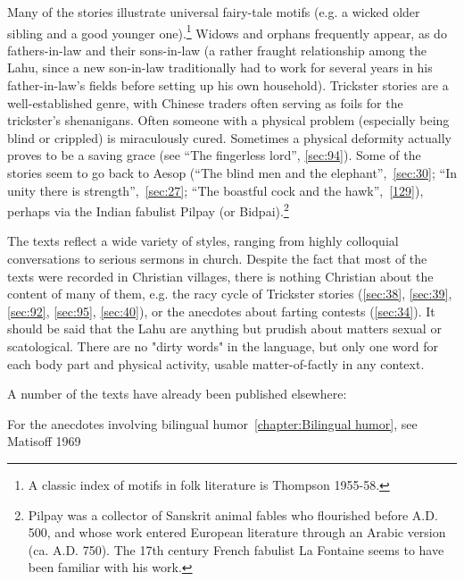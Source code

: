 Many of the stories illustrate universal fairy-tale motifs (e.g. a
wicked older sibling and a good younger one).\footnote{A classic index
  of motifs in folk literature is Thompson 1955-58.} Widows and
orphans frequently appear, as do fathers-in-law and their sons-in-law
(a rather fraught relationship among the Lahu, since a new son-in-law
traditionally had to work for several years in his father-in-law's
fields before setting up his own household). Trickster stories are a
well-established genre, with Chinese traders often serving as foils
for the trickster's shenanigans. Often someone with a physical problem
(especially being blind or crippled) is miraculously cured. Sometimes
a physical deformity actually proves to be a saving grace (see ``The
fingerless lord'', \ref{sec:94}). Some of the stories seem to go back
to Aesop (``The blind men and the elephant'',~\ref{sec:30}; ``In unity
there is strength'',~\ref{sec:27}; ``The boastful cock and the
hawk'',~\ref{129}), perhaps via the Indian fabulist Pilpay (or
Bidpai).\footnote{Pilpay was a collector of Sanskrit animal fables who
  flourished before A.D. 500, and whose work entered European
  literature through an Arabic version (ca. A.D. 750). The 17th
  century French fabulist La Fontaine seems to have been familiar with
  his work.}


\protect\hypertarget{anchor}{}{}The texts reflect a wide variety of
styles, ranging from highly colloquial conversations to serious
sermons in church. Despite the fact that most of the texts were
recorded in Christian villages, there is nothing Christian about the
content of many of them, e.g. the racy cycle of Trickster stories
(\ref{sec:38}, \ref{sec:39}, \ref{sec:92}, \ref{sec:95},
\ref{sec:40}), or the anecdotes about farting contests
(\ref{sec:34}). It should be said that the Lahu are anything but
prudish about matters sexual or scatological. There are no "dirty
words" in the language, but only one word for each body part and
physical activity, usable matter-of-factly in any context.

A number of the texts have already been published elsewhere:

For the anecdotes involving bilingual humor~\ref{chapter:Bilingual humor}, see Matisoff 1969

